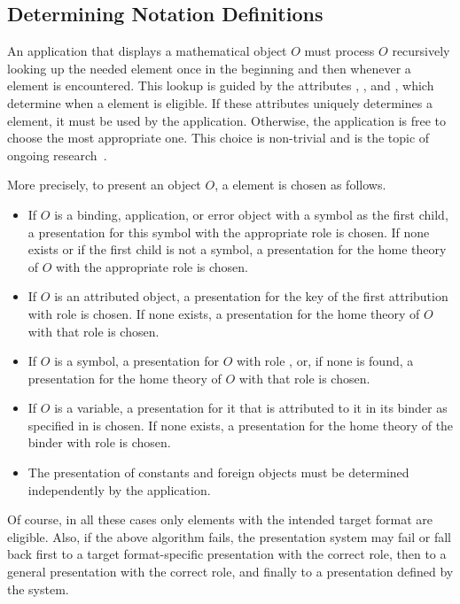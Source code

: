 \subsection{Determining Notation Definitions}\label{sec:determining}

An application that displays a mathematical object $O$ must process $O$ recursively
looking up the needed {} element once in the beginning and then
whenever a {} element is encountered. This lookup is guided by the
attributes {}, {}, and
{}, which determine when a {}
element is eligible. If these attributes uniquely determines a {}
element, it must be used by the application. Otherwise, the application is free to choose
the most appropriate one. This choice is non-trivial and is the topic of ongoing
research~\cite{KohMueMue:dfncimk07}.

More precisely, to present an object $O$, a {} element is chosen
as follows.
\begin{itemize}
\item If $O$ is a binding, application, or error object with a symbol as the first child,
  a presentation for this symbol with the appropriate role is chosen. If none exists or if the first
  child is not a symbol, a presentation for the home theory of $O$ with the appropriate
  role is chosen. 
\item If $O$ is an attributed object, a presentation for the key of the first attribution
  with role {} is chosen. If none exists, a presentation for the
  home theory of $O$ with that role is chosen.
\item If $O$ is a symbol, a presentation for $O$ with role
  {}, or, if none is found, a presentation for the home
  theory of $O$ with that role is chosen.
\item If $O$ is a variable, a presentation for it that is attributed to it in its binder
  as specified in {} is chosen. If none exists, a presentation for the home theory of
  the binder with role {} is chosen.
\item The presentation of constants and foreign objects must be determined independently
  by the application.
\end{itemize}
Of course, in all these cases only {} elements with the intended
target format are eligible. Also, if the above algorithm fails, the presentation system may fail or fall back first to a
target format-specific presentation with the correct role, then to a general presentation with the correct role, and finally to a presentation defined by the system.

